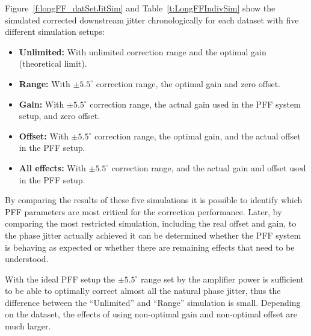 Figure~\ref{f:longFF_datSetJitSim} and Table~\ref{t:LongFFIndivSim} show the simulated corrected downstream jitter chronologically for each dataset with five different simulation setups:
\begin{itemize}
\item \textbf{Unlimited:} With unlimited correction range and the optimal gain (theoretical limit).
\item \textbf{Range:} With \(\pm5.5^\circ\) correction range, the optimal gain and zero offset.
\item \textbf{Gain:} With \(\pm5.5^\circ\) correction range, the actual gain used in the PFF system setup, and zero offset.
\item \textbf{Offset:} With \(\pm5.5^\circ\) correction range, the optimal gain, and the actual offset in the PFF setup.
\item \textbf{All effects:} With \(\pm5.5^\circ\) correction range, and the actual gain and offset used in the PFF setup.
\end{itemize}

By comparing the results of these five simulations it is possible to identify which PFF parameters are most critical for the correction performance. Later, by comparing the most restricted simulation, including the real offset and gain, to the phase jitter actually achieved it can be determined whether the PFF system is behaving as expected or whether there are remaining effects that need to be understood.

With the ideal PFF setup the \(\pm5.5^\circ\) range set by the amplifier power is sufficient to be able to optimally correct almost all the natural phase jitter, thus the difference between the ``Unlimited'' and ``Range'' simulation is small. Depending on the dataset, the effects of using non-optimal gain and non-optimal offset are much larger.

%


